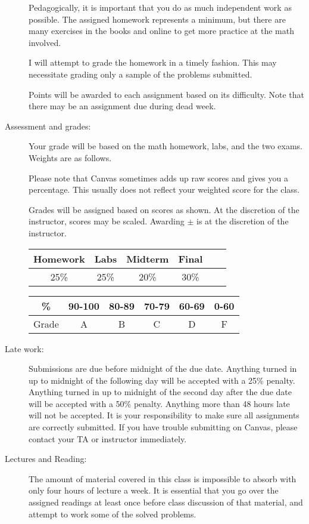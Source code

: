 \documentclass{article}
\begin{document}
\begin{description}
  Pedagogically, it is important that you do as much independent work
  as possible.  The assigned homework represents a minimum, but there
  are many exercises in the books and online to get more practice at
  the math involved.

  I will attempt to grade the homework in a timely fashion.  This may
  necessitate grading only a sample of the problems submitted.

  Points will be awarded to each assignment based on its difficulty.
  Note that there may be an assignment due during dead week.

\item[Assessment and grades:]

Your grade will be based on the math homework, labs, and the two
exams. Weights are as follows.  

Please note that Canvas sometimes adds up raw scores and gives you a
percentage.  This usually does not reflect your weighted score for the
class.

Grades will be assigned based on scores as shown.  At the discretion
of the instructor, scores may be scaled.  Awarding $\pm$ is at the
discretion of the instructor.

\begin{tabular}{|c|c|c|c|c|c|}\hline
Homework & Labs & Midterm & Final\\\hline
25\% & 25\%  & 20\% & 30\% \\\hline
\end{tabular}\hfill
\begin{tabular}{|c|c|c|c|c|c|}\hline
\% & 90-100 & 80-89 & 70-79 & 60-69 & 0-60\\\hline
Grade & A & B & C & D & F\\\hline
\end{tabular}

\item[Late work:] Submissions are due before midnight of the due
  date. Anything turned in up to midnight of the following day will be
  accepted with a 25\% penalty. Anything turned in up to midnight of
  the second day after the due date will be accepted with a 50\%
  penalty.  Anything more than 48 hours late will not be accepted.  It
  is your responsibility to make sure all assignments are correctly
  submitted.  If you have trouble submitting on Canvas, please contact
  your TA or instructor immediately.

\item[Lectures and Reading:] The amount of material covered in this
  class is impossible to absorb with only four hours of lecture a
  week.  It is essential that you go over the assigned readings at
  least once before class discussion of that material, and attempt to
  work some of the solved problems.


\end{description}
\end{document}
